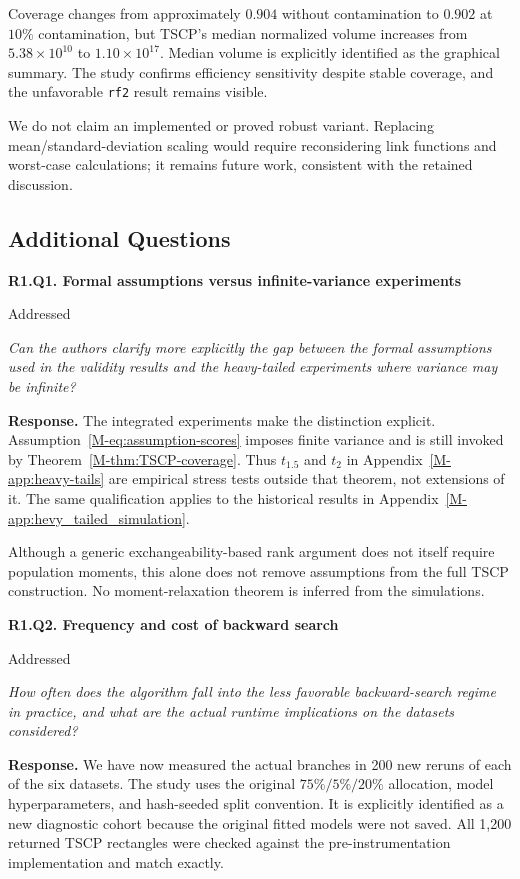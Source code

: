 \documentclass[11pt]{article}
\newcommand{\msapp}[1]{Appendix~\ref*{M-#1}}
\newcommand{\point}[3]{\par\Needspace{7\baselineskip}\medskip
\noindent\parbox[t]{0.77\linewidth}{\textbf{#1}}\hfill
\parbox[t]{0.21\linewidth}{\raggedleft\small\sffamily #2}\par\nopagebreak
{\color{ReviewerBlue}\small\itshape #3\par}\textbf{Response.} }
\begin{document}
Coverage changes from approximately $0.904$ without contamination to $0.902$ at $10\%$ contamination, but TSCP's median normalized volume increases from $5.38\times10^{10}$ to $1.10\times10^{17}$. Median volume is explicitly identified as the graphical summary. The study confirms efficiency sensitivity despite stable coverage, and the unfavorable \texttt{rf2} result remains visible.

We do not claim an implemented or proved robust variant. Replacing mean/standard-deviation scaling would require reconsidering link functions and worst-case calculations; it remains future work, consistent with the retained discussion.

\subsection*{Additional Questions}

\point{R1.Q1. Formal assumptions versus infinite-variance experiments}{Addressed}{Can the authors clarify more explicitly the gap between the formal
assumptions used in the validity results and the heavy-tailed
experiments where variance may be infinite?}
\label{response:R1.Q1}
The integrated experiments make the distinction explicit. Assumption~\ref*{M-eq:assumption-scores} imposes finite variance and is still invoked by Theorem~\ref*{M-thm:TSCP-coverage}. Thus $t_{1.5}$ and $t_2$ in \msapp{app:heavy-tails} are empirical stress tests outside that theorem, not extensions of it. The same qualification applies to the historical results in \msapp{app:hevy_tailed_simulation}.

Although a generic exchangeability-based rank argument does not itself require population moments, this alone does not remove assumptions from the full TSCP construction. No moment-relaxation theorem is inferred from the simulations.

\point{R1.Q2. Frequency and cost of backward search}{Addressed}{How often does the algorithm fall into the less favorable
backward-search regime in practice, and what are the actual runtime
implications on the datasets considered?}
\label{response:R1.Q2}
We have now measured the actual branches in 200 new reruns of each of the six datasets. The study uses the original $75\%/5\%/20\%$ allocation, model hyperparameters, and hash-seeded split convention. It is explicitly identified as a new diagnostic cohort because the original fitted models were not saved. All 1,200 returned TSCP rectangles were checked against the pre-instrumentation implementation and match exactly.
\end{document}
